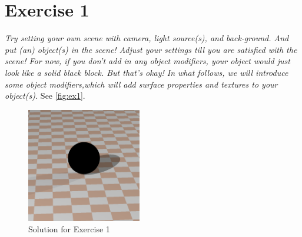 \section{Exercise 1}
\textit{Try setting your own scene with camera, light source(s), and back-ground. And put (an) object(s) in the scene! Adjust your settings till you are satisfied with the scene! For now, if you don’t add in any object modifiers, your object would just look like a solid black block. But that’s okay! In what follows, we will introduce some object modifiers,which will add surface properties and textures to your object(s).}
See \autoref{fig:ex1}.

\begin{figure}[h]
  \centering
  \includegraphics[height=5cm]{ex1.png}
  \caption{Solution for Exercise 1}
  \label{fig:ex1}
\end{figure}
